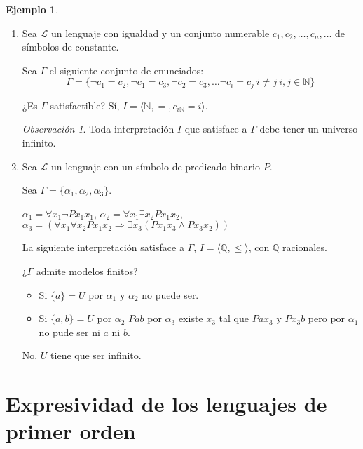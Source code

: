 \documentclass[a4paper,11pt]{article}
\theoremstyle{definition}
\newtheorem{exap}{Ejemplo}[section]
\theoremstyle{remark}
\newtheorem*{remk}{Observación}
\def\NN{\mathbb{N}}
\def\QQ{\mathbb{Q}}
\def\LL{\ensuremath{\mathcal{L}}}
\begin{document}
\begin{exap}
    \begin{enumerate}
        \item Sea $\LL$ un lenguaje con igualdad y un conjunto numerable 
        $c_1, c_2, \dots, c_n, \dots$ de símbolos de constante.
     
        Sea $\Gamma$ el siguiente conjunto de enunciados:
        \[\Gamma = \{ 
            \lnot c_1 = c_2, \lnot c_1 = c_3, \lnot c_2 = c_3, \dots
            \lnot c_i = c_j\ i\neq j\ i,j \in \NN
        \}\]
     
        ¿Es $\Gamma$ satisfactible? Sí, 
        $I = \langle \NN, =, c_{i \NN} = i\rangle$.
     
        \begin{remk}
            Toda interpretación $I$ que satisface a $\Gamma$ debe
            tener un universo infinito.
        \end{remk}
     
        \item Sea $\LL$ un lenguaje con un símbolo de predicado binario $P$.
        
        Sea $\Gamma = \{\alpha_1, \alpha_2, \alpha_3\}$.
        
        $\alpha_1 = \forall x_1 \lnot P x_1 x_1$,
        $\alpha_2 = \forall x_1 \exists x_2 P x_1 x_2$,
        $\alpha_3 = (\forall x_1 \forall x_2 P x_1 x_2
            \Rightarrow \exists x_3 (P x_1 x_3 \land P x_3 x_2))$
            
        La siguiente interpretación satisface a $\Gamma$, 
        $I = \langle \QQ, \leq \rangle$, con $\QQ$ racionales.
        
        ¿$\Gamma$ admite modelos finitos? 
        
        \begin{itemize}
            \item Si $\{a\} = U$ por $\alpha_1$ y $\alpha_2$ no puede ser.
            
            \item Si $\{a, b\} = U$ por $\alpha_2$ $P a b$
            por $\alpha_3$ existe $x_3$ tal que $P a x_3$ y $P x_3 b$
            pero por $\alpha_1$ no pude ser ni $a$ ni $b$.
        \end{itemize}
        
        No. $U$ tiene que ser infinito.
    \end{enumerate}
\end{exap}

\section*{Expresividad de los lenguajes de primer orden}
\end{document}
